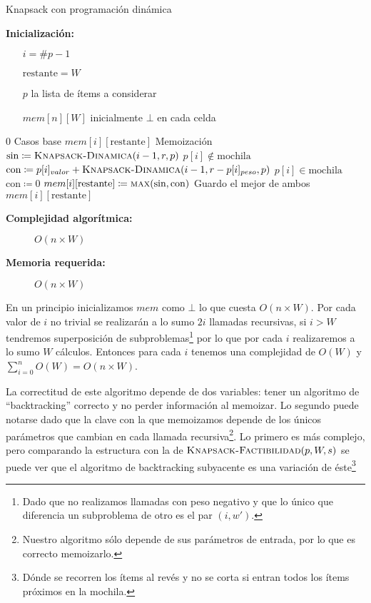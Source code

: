 \documentclass[fleqn, 11pt]{article}
\def\is{\coloneqq}
\begin{document}
\begin{algorithm}
\caption{Knapsack con programación dinámica}
\begin{algorithmic}[1]
\item[\textbf{Inicialización:}]
\item[] \begin{itemize}
	\item[] $i = \#p - 1$
	\item[] $\text{restante} = W$
	\item[] $p$ la lista de ítems a considerar
	\item[] $mem[n][W]$ inicialmente $\bot$ en cada celda
\end{itemize}
\Statex
{}
	\State \Return $0$
\Comment Casos base
\EndIf
{}
	\State	\Return $mem[i][\text{restante}]$
	\Comment Memoización
\EndIf
\State $\text{sin} \is \Call{Knapsack-Dinamica}{i - 1, r, p}$
\Comment $p[i] \not \in \text{mochila}$
	\State $\text{con} \is p[i]_{valor} + \Call{Knapsack-Dinamica}{i - 1, r - p[i]_{peso}, p}$
	\Comment $p[i] \in \text{mochila}$
\Else
	\State $\text{con} \is 0$
\EndIf
\State $mem[i][\text{restante}] \is \Call{max}{\text{sin}, \text{con}}$
\Comment Guardo el mejor de ambos
\State \Return $mem[i][\text{restante}]$
\EndFunction
\end{algorithmic}
\begin{description}
	\item[\textbf{Complejidad algorítmica:}] $O(n \times W)$
	\item[\textbf{Memoria requerida:}] $O(n \times W)$
\end{description}
\end{algorithm}

En un principio inicializamos $mem$ como $\bot$ lo que cuesta $O(n \times W)$.
Por cada valor de $i$ no trivial se realizarán a lo sumo $2i$ llamadas
recursivas, si $i > W$ tendremos superposición de subproblemas\footnote{Dado
que no realizamos llamadas con peso negativo y que lo único que diferencia un
subproblema de otro es el par $(i, w')$.} por lo que por cada $i$ realizaremos
a lo sumo $W$ cálculos. Entonces para cada $i$ tenemos una complejidad de
$O(W)$ y $\sum_{i=0}^{n} O(W) = O(n \times W)$.

\clearpage

La correctitud de este algoritmo depende de dos variables: tener un algoritmo
de ``backtracking'' correcto y no perder información al memoizar. Lo segundo
puede notarse dado que la clave con la que memoizamos depende de los únicos
parámetros que cambian en cada llamada recursiva\footnote{Nuestro algoritmo
sólo depende de sus parámetros de entrada, por lo que es correcto memoizarlo.}.
Lo primero es más complejo, pero comparando la estructura con la de
$\Call{Knapsack-Factibilidad}{p, W, s}$ se puede ver que el algoritmo de
backtracking subyacente es una variación de éste\footnote{Dónde se recorren los
ítems al revés y no se corta si entran todos los ítems próximos en la mochila.}
\end{document}
